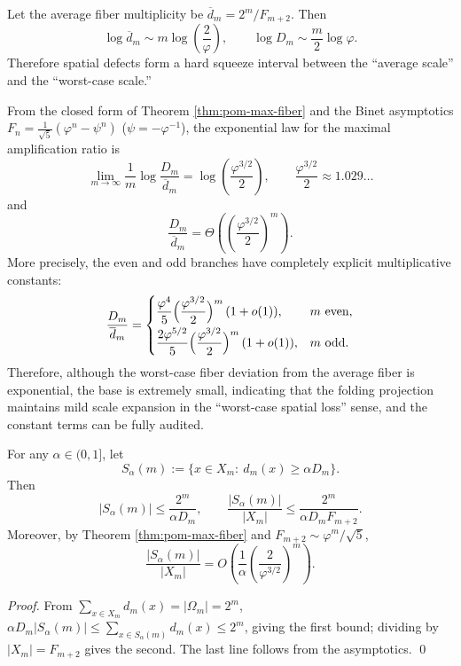 \begin{corollary}\label{cor:pom-defect-band}
Let the average fiber multiplicity be $\overline d_m=2^m/F_{m+2}$. Then
\[
\log \overline d_m\sim m\log\!\left(\frac{2}{\varphi}\right),
\qquad
\log D_m\sim \frac{m}{2}\log\varphi.
\]
Therefore spatial defects form a hard squeeze interval between the ``average scale'' and the ``worst-case scale.''
\end{corollary}

\begin{remark}\label{rem:pom-defect-gap}
From the closed form of Theorem \ref{thm:pom-max-fiber} and the Binet asymptotics \(F_n=\frac{1}{\sqrt5}(\varphi^n-\psi^n)\) (\(\psi=-\varphi^{-1}\)), the exponential law for the maximal amplification ratio is
\[
\lim_{m\to\infty}\frac{1}{m}\log\frac{D_m}{\overline d_m}
=\log\!\left(\frac{\varphi^{3/2}}{2}\right),
\qquad
\frac{\varphi^{3/2}}{2}\approx 1.029\ldots
\]
and
\[
\frac{D_m}{\overline d_m}
=
\Theta\!\left(\left(\frac{\varphi^{3/2}}{2}\right)^m\right).
\]
More precisely, the even and odd branches have completely explicit multiplicative constants:
\[
\frac{D_m}{\overline d_m}
=
\begin{cases}
\displaystyle \frac{\varphi^{4}}{5}\Bigl(\frac{\varphi^{3/2}}{2}\Bigr)^{m}\,(1+o(1)),& m\ \text{even},\\[1.2ex]
\displaystyle \frac{2\varphi^{5/2}}{5}\Bigl(\frac{\varphi^{3/2}}{2}\Bigr)^{m}\,(1+o(1)),& m\ \text{odd}.
\end{cases}
\]
Therefore, although the worst-case fiber deviation from the average fiber is exponential, the base is extremely small, indicating that the folding projection maintains mild scale expansion in the ``worst-case spatial loss'' sense, and the constant terms can be fully audited.
\end{remark}

\begin{corollary}\label{cor:pom-high-multiplicity-sparse}
For any $\alpha\in(0,1]$, let
\[
S_\alpha(m):=\{x\in X_m:\ d_m(x)\ge \alpha D_m\}.
\]
Then
\[
|S_\alpha(m)|\le \frac{2^m}{\alpha D_m},
\qquad
\frac{|S_\alpha(m)|}{|X_m|}\le \frac{2^m}{\alpha D_m F_{m+2}}.
\]
Moreover, by Theorem \ref{thm:pom-max-fiber} and $F_{m+2}\sim \varphi^m/\sqrt5$,
\[
\frac{|S_\alpha(m)|}{|X_m|}
=O\!\left(\frac{1}{\alpha}\left(\frac{2}{\varphi^{3/2}}\right)^m\right).
\]
\end{corollary}
\begin{proof}
From $\sum_{x\in X_m} d_m(x)=|\Omega_m|=2^m$,
\(
\alpha D_m |S_\alpha(m)|\le \sum_{x\in S_\alpha(m)} d_m(x)\le 2^m
\),
giving the first bound; dividing by $|X_m|=F_{m+2}$ gives the second. The last line follows from the asymptotics. \qed
\end{proof}







